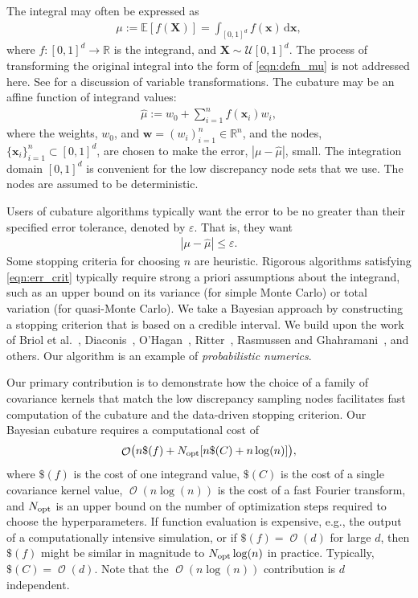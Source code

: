 \documentclass[twocolumn]{svjour3}          %
\DeclareMathOperator{\Order}{{\mathcal O}}
\newcommand{\bm}[1]{\boldsymbol{#1}}
\newcommand{\dif}[1]{\text{d}{#1}}
\newcommand{\reals}{\mathbb{R}}
\newcommand{\Ex}{\mathbb{E}}
\newcommand{\vw}{\bm{w}}
\newcommand{\vx}{\bm{x}}
\newcommand{\opt}{{\textup{opt}}}
\newcommand{\hmu}{\widehat{\mu}}
\newcommand{\errtol}{\varepsilon}
\def\abs#1{\ensuremath{\left \lvert #1 \right \rvert}}
\begin{document}
The integral may often be expressed as
\begin{align}
\label{eqn:defn_mu}
\mu:= \Ex[f(\boldsymbol{X})] = \int_{[0,1]^d} f(\vx)\, \dif\vx, 
\end{align}
where $f:[0,1]^d \to \reals$ is the integrand, and $\boldsymbol{X} \sim \mathcal{U}[0,1]^d$.  The process of transforming the original integral into the form of \eqref{eqn:defn_mu} is not addressed here. See \cite[Section 2.11]{DicEtal14a} 
for a discussion of variable transformations. The cubature may be an affine function of integrand values:
\begin{align}
\label{eqn:defn_hmu}  %
\hmu := w_0 + \sum_{i=1}^{n} f(\vx_i) w_i,
\end{align}
where the weights, $w_0$, and  $\vw = (w_i)_{i=1}^n \in \reals^n$, and the nodes, $\{\vx_i\}_{i=1}^n \subset [0,1]^d$, are chosen to make the error, $\abs{\mu - \hmu}$, small. The integration domain $[0,1]^d$ is convenient for the low discrepancy node sets \cite{DicEtal14a,SloJoe94} that we use.  The nodes are assumed to be deterministic.

Users of cubature algorithms typically want the error to be no greater than their specified error tolerance, denoted by $\varepsilon$.  That is, they want
\begin{align}
\label{eqn:err_crit} 
\abs{\mu - \hmu} \leq \errtol .
\end{align}
Some stopping criteria for choosing $n$ are heuristic.  Rigorous algorithms satisfying \eqref{eqn:err_crit}  typically require strong a priori assumptions about the integrand, such as an upper bound on its variance (for simple Monte Carlo) or total variation (for quasi-Monte Carlo).  We take a Bayesian approach by constructing a stopping criterion that is based on a credible interval.  We build upon the work of Briol et al.~\cite{BriEtal18a}, Diaconis~\cite{Dia88a}, O'Hagan~\cite{OHa91a}, Ritter~\cite{Rit00a}, Rasmussen and Ghahramani~\cite{RasGha03a}, and others.  Our algorithm is an example of \emph{probabilistic numerics}.

Our primary contribution is to demonstrate how the choice of a family of covariance kernels that match the low discrepancy sampling nodes facilitates fast computation of the cubature and the data-driven stopping criterion.  Our Bayesian cubature requires a computational cost of
\begin{equation} \label{eqn:OuralgoCost}
    \Order\bigl(n \$(f) + N_{\opt}[n\$(C) + n \log(n)] \bigr),
\end{equation} 
where $\$(f)$ is the cost of one integrand value, $\$(C)$ is the cost of a single covariance kernel value,  $\Order(n \log(n))$ is the cost of a fast Fourier transform, and $N_{\opt}$ is an upper bound on the number of optimization steps required to choose the hyperparameters. If function evaluation is expensive, e.g., the output of a computationally intensive simulation, or if $\$(f) = \Order(d)$ for large $d$, then $\$(f)$ might be similar in magnitude to $N_{\opt} \log(n)$ in practice.  Typically, $\$(C) = \Order(d)$.  Note that the $\Order(n \log(n))$ contribution is $d$ independent.
\end{document}
